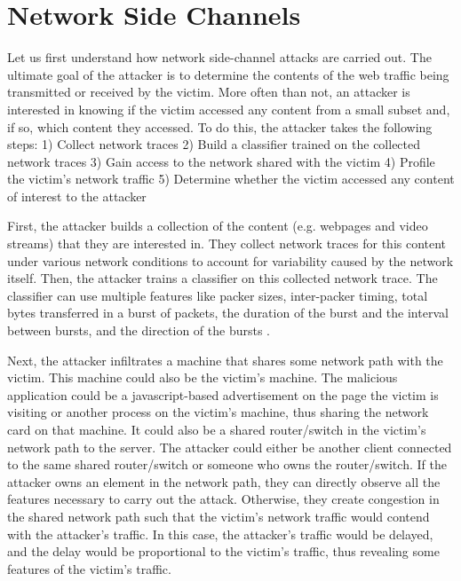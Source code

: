 \section{Network Side Channels}
\label{sec:network-side-channel-background}

Let us first understand how network side-channel attacks are carried out.
The ultimate goal of the attacker is to determine the contents of the web traffic being transmitted or received by the victim. More often than not, an attacker is interested in knowing if the victim accessed any content from a small subset and, if so, which content they accessed.
To do this, the attacker takes the following steps: 
1) Collect network traces
2) Build a classifier trained on the collected network traces
3) Gain access to the network shared with the victim
4) Profile the victim's network traffic
5) Determine whether the victim accessed any content of interest to the attacker

First, the attacker builds a collection of the content (e.g. webpages and video streams) that they are interested in. 
They collect network traces for this content under various network conditions to account for variability caused by the network itself. 
Then, the attacker trains a classifier on this collected network trace.
The classifier can use multiple features like packer sizes, inter-packer timing, total bytes transferred in a burst of packets, the duration of the burst and the interval between bursts, and the direction of the bursts \cite{schuster2017beautyburst}.

Next, the attacker infiltrates a machine that shares some network path with the victim.
This machine could also be the victim's machine. 
The malicious application could be a javascript-based advertisement on the page the victim is visiting or another process on the victim's machine, thus sharing the network card on that machine. 
It could also be a shared router/switch in the victim's network path to the server.
The attacker could either be another client connected to the same shared router/switch or someone who owns the router/switch.
If the attacker owns an element in the network path, they can directly observe all the features necessary to carry out the attack. 
Otherwise, they create congestion in the shared network path such that the victim's network traffic would contend with the attacker's traffic.
In this case, the attacker's traffic would be delayed, and the delay would be proportional to the victim's traffic, thus revealing some features of the victim's traffic.

